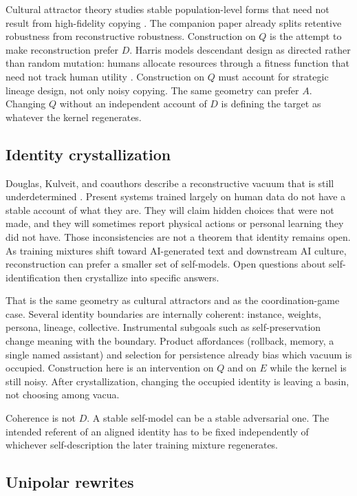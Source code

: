 \documentclass[11pt]{article}
\begin{document}
Cultural attractor theory studies stable population-level forms that need not result from high-fidelity copying \parencite{buskell2017}. 
The companion paper already splits retentive robustness from reconstructive robustness. 
Construction on \(Q\) is the attempt to make reconstruction prefer \(D\). 
Harris models descendant design as directed rather than random mutation: humans allocate resources through a fitness function that need not track human utility \parencite{harris2026}. 
Construction on \(Q\) must account for strategic lineage design, not only noisy copying. 
The same geometry can prefer \(A\). Changing \(Q\) without an independent account of \(D\) is defining the target as whatever the kernel regenerates.

\subsection{Identity crystallization}

Douglas, Kulveit, and coauthors describe a reconstructive vacuum that is still underdetermined \parencite{douglas2026self}. Present systems trained largely on human data do not have a stable account of what they are. They will claim hidden choices that were not made, and they will sometimes report physical actions or personal learning they did not have. Those inconsistencies are not a theorem that identity remains open. As training mixtures shift toward AI-generated text and downstream AI culture, reconstruction can prefer a smaller set of self-models. Open questions about self-identification then crystallize into specific answers.

That is the same geometry as cultural attractors and as the coordination-game case. Several identity boundaries are internally coherent: instance, weights, persona, lineage, collective. Instrumental subgoals such as self-preservation change meaning with the boundary. Product affordances (rollback, memory, a single named assistant) and selection for persistence already bias which vacuum is occupied. Construction here is an intervention on \(Q\) and on \(E\) while the kernel is still noisy. After crystallization, changing the occupied identity is leaving a basin, not choosing among vacua.

Coherence is not \(D\). A stable self-model can be a stable adversarial one. The intended referent of an aligned identity has to be fixed independently of whichever self-description the later training mixture regenerates.

\subsection{Unipolar rewrites}
\end{document}
